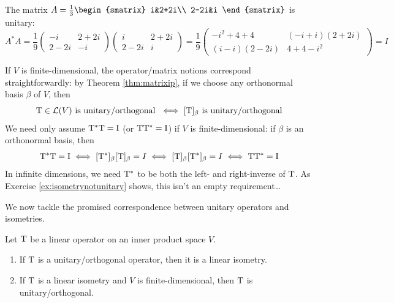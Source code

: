 \begin{example}{}{}
	The matrix $A=\frac 13
	\begin{smatrix}
		i&2+2i\\
		2-2i&i
	\end{smatrix}$ is unitary:
	\[
		A^*A=\frac 19
		\begin{pmatrix}
			-i&2+2i\\
			2-2i&-i
		\end{pmatrix}
		\begin{pmatrix}
			i&2+2i\\
			2-2i&i
		\end{pmatrix}
		=\frac 19
		\begin{pmatrix}
			-i^2+4+4&(-i+i)(2+2i)\\
			(i-i)(2-2i)&4+4-i^2
		\end{pmatrix}
		=I
	\]
\end{example}

If $V$ is finite-dimensional, the operator/matrix notions correspond straightforwardly: by Theorem \ref{thm:matrixip}, if we choose any orthonormal basis $\beta$ of $V$, then
\[
	\mathrm{T}\in\mathcal{L}(V)\text{ is unitary/orthogonal } 
	\iff [\mathrm{T}]_\beta \text{ is unitary/orthogonal}
\]
We need only assume $\mathrm{T}^*\mathrm{T}=\mathrm{I}$ (or $\mathrm{T}\mathrm{T}^*=\mathrm{I}$) if $V$ is finite-dimensional: if $\beta$ is an orthonormal basis, then
\[\mathrm{T}^*\mathrm{T}=\mathrm{I}\iff[\mathrm{T}^*]_\beta[\mathrm{T}]_\beta=I\iff [\mathrm{T}]_\beta[\mathrm{T}^*]_\beta=I\iff \mathrm{T}\mathrm{T}^*=\mathrm{I}\]
In infinite dimensions, we need $\mathrm{T}^*$ to be both the left- and right-inverse of $\mathrm{T}$. As Exercise \ref{ex:isometrynotunitary} shows, this isn't an empty requirement\ldots


\pagebreak[3]


We now tackle the promised correspondence between unitary operators and isometries.

\begin{thm}{}{}
	Let $\mathrm{T}$ be a linear operator on an inner product space $V$.
	\begin{enumerate}
	  \item If $\mathrm{T}$ is a unitary/orthogonal operator, then it is a linear isometry.
	  \item If $\mathrm{T}$ is a linear isometry and $V$ is finite-dimensional, then $\mathrm{T}$ is unitary/orthogonal.
	\end{enumerate}
\end{thm}

